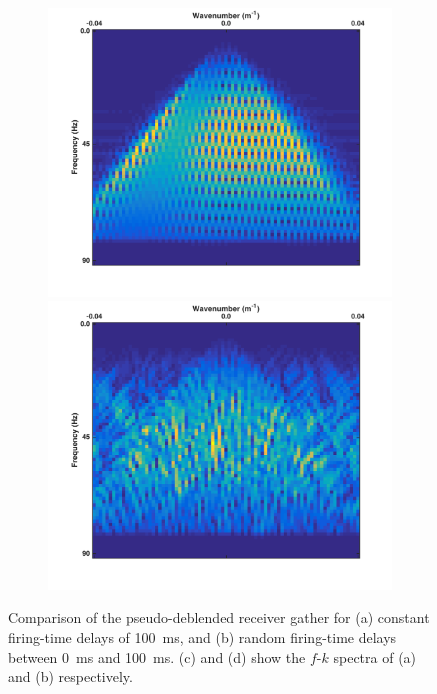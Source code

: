 \begin{figure}
\begin{subfigure}[b]{0.3\textwidth}
		\centering
		\includegraphics[width = \textwidth]{Plots/Mahdad/25iter/TimeDelay/FK-Pseudo-deblendedCRG_rec30_coh}
		\caption{}
		\label{fig:Ch-Theory-PseudoCRG-FK-CoherentDelay}
		
		\par\bigskip
		
		\centering
		\includegraphics[width = \textwidth]{Plots/Mahdad/25iter/TimeDelay/FK-Pseudo-deblendedCRG_rec30}
		\caption{}
		\label{fig:Ch-Theory-PseudoCRG-FK-IncoherentDelay}
		
	\end{subfigure}
	
	\caption{Comparison of the pseudo-deblended receiver gather for (a) constant firing-time delays of \SI{100}{\milli\second}, and (b) random firing-time delays between \SI{0}{\milli\second} and \SI{100}{\milli\second}. (c) and (d) show the $f$-$k$ spectra of (a) and (b) respectively.}
	\label{fig:Ch-Theory-PseudoCRG-IncoherencyEffect}

\end{figure}


